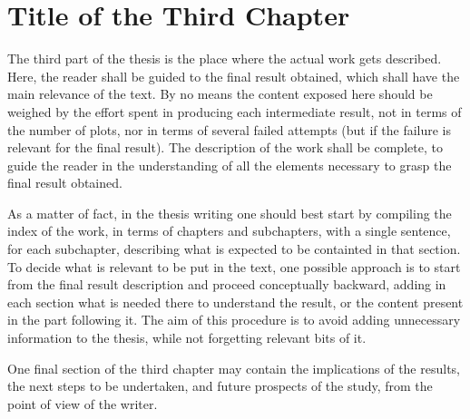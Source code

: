 \chapter{Title of the Third Chapter}

The third part of the thesis is the place where the actual work gets described.
Here, 
the reader shall be guided to the final result obtained,
which shall have the main relevance of the text.
By no means the content exposed here should be weighed 
by the effort spent in producing each intermediate result,
not in terms of the number of plots, 
nor in terms of several failed attempts 
(but if the failure is relevant for the final result).
The description of the work shall be complete,
to guide the reader in the understanding of all the elements
necessary to grasp the final result obtained.

As a matter of fact, 
in the thesis writing one should best start by compiling the index of the work,
in terms of chapters and subchapters,
with a single sentence, for each subchapter, 
describing what is expected to be containted in that section.
To decide what is relevant to be put in the text,
one possible approach is to start from the final result description
and proceed conceptually backward,
adding in each section what is needed there to understand the result, 
or the content present in the part following it.
The aim of this procedure is to avoid adding unnecessary information to the thesis,
while not forgetting relevant bits of it.

One final section of the third chapter may contain 
the implications of the results,
the next steps to be undertaken,
and future prospects of the study,
from the point of view of the writer.